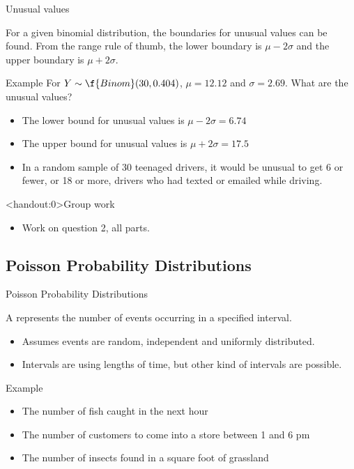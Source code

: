 \documentclass[xcolor=table]{beamer}
\begin{document}
\begin{frame}{Unusual values}
\begin{block}{}
For a given binomial distribution, the boundaries for unusual values can be found. From the range rule of thumb, the lower boundary is $\mu - 2 \sigma$ and the upper boundary is $\mu + 2\sigma$.
\end{block}
\pause
\begin{exampleblock}{Example}
For $Y \sim \f{Binom}(30, 0.404)$, $\mu = 12.12$ and $\sigma = 2.69$. What are the unusual values?
\begin{itemize}
\pause\item The lower bound for unusual values is $\mu - 2 \sigma = 6.74$
\pause\item The upper bound for unusual values is $\mu + 2 \sigma = 17.5$
\pause\item In a random sample of 30 teenaged drivers, it would be unusual to get 6 or fewer, or 18 or more, drivers who had texted or emailed while driving.
\end{itemize}
\end{exampleblock}
\end{frame}

\begin{frame}<handout:0>{Group work}
\begin{block}{}
\large
\begin{itemize}
\item Work on question 2, all parts.
\end{itemize}
\end{block}
\end{frame}


\subsection{Poisson Probability Distributions}

\begin{frame}{Poisson Probability Distributions}
\begin{block}{}
{\large A  represents the number of events occurring in a specified interval.} 
\begin{itemize}
\pause\item Assumes events are random, independent and uniformly distributed.
\pause\item Intervals are using lengths of time, but other kind of intervals are possible.
\end{itemize}
\end{block}
\pause
\begin{exampleblock}{Example}
\begin{itemize}
\item The number of fish caught in the next hour
\item The number of customers to come into a store between 1 and 6 pm
\item The number of insects found in a square foot of grassland
\end{itemize}
\end{exampleblock}
\end{frame}
\end{document}
